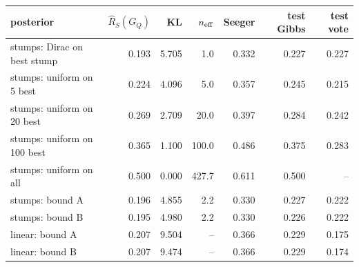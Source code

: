 \begin{tabular}{lrrrrrr}
\toprule
posterior & $\widehat R_S(G_Q)$ & KL & $n_{\rm eff}$ & Seeger & test Gibbs & test vote \\
\midrule
stumps: Dirac on best stump & 0.193 & 5.705 & 1.0 & 0.332 & 0.227 & 0.227 \\
stumps: uniform on 5 best & 0.224 & 4.096 & 5.0 & 0.357 & 0.245 & 0.215 \\
stumps: uniform on 20 best & 0.269 & 2.709 & 20.0 & 0.397 & 0.284 & 0.242 \\
stumps: uniform on 100 best & 0.365 & 1.100 & 100.0 & 0.486 & 0.375 & 0.283 \\
stumps: uniform on all & 0.500 & 0.000 & 427.7 & 0.611 & 0.500 & -- \\
stumps: bound A & 0.196 & 4.855 & 2.2 & 0.330 & 0.227 & 0.222 \\
stumps: bound B & 0.195 & 4.980 & 2.2 & 0.330 & 0.226 & 0.222 \\
linear: bound A & 0.207 & 9.504 & -- & 0.366 & 0.229 & 0.175 \\
linear: bound B & 0.207 & 9.474 & -- & 0.366 & 0.229 & 0.174 \\
\bottomrule
\end{tabular}
